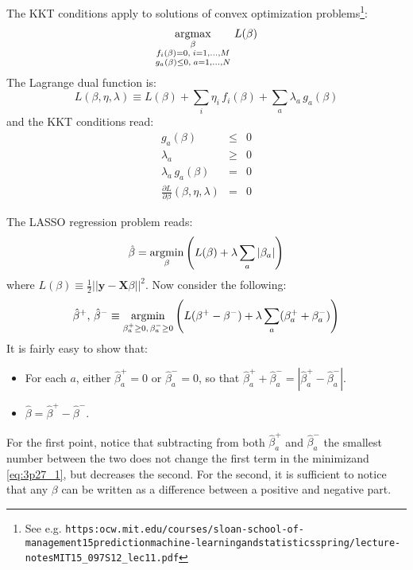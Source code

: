 

The KKT conditions apply to solutions of convex optimization problems\footnote{See e.g.
    \texttt{https:\/\/ocw.mit.edu/courses/sloan-school-of-management\/15\-prediction\-machine-learning\-and\-statistics\-spring/lecture-notes\/MIT15\_097S12\_lec11.pdf}}:
\begin{eqnarray}\label{eq:3p27_0}
    \operatorname*{argmax}_{\substack{\beta\\f_i(\beta) = 0, \; i = 1, \ldots, M \\
    g_a(\beta) \leq 0, \; a = 1, \ldots, N}} \, L(\beta)
\end{eqnarray}
The Lagrange dual function is:
\begin{equation*}
L(\beta, \eta, \lambda) \equiv L(\beta) + \sum_i \eta_i \, f_i(\beta) + 
    \sum_a \lambda_a \, g_a(\beta)
\end{equation*}
and the KKT conditions read:
\begin{eqnarray} \label{eq:3p27_kkt1}
    g_a(\beta) & \leq & 0 \\
    \lambda_a & \geq & 0 \\
    \lambda_a \, g_a(\beta) & = & 0 \\ \label{eq:3p27_kkt4}
    \frac{\partial L}{\partial \beta}(\beta, \eta, \lambda) & = & 0
\end{eqnarray}

The LASSO regression problem reads:
\begin{eqnarray*}
    \hat{\beta} = \operatorname*{argmin}_\beta \left( L(\beta) + \lambda \sum_{a} |\beta_a|\right)
\end{eqnarray*}
where $L(\beta) \equiv \frac{1}{2}||\mathbf{y} - \mathbf{X} \beta||^2$.
Now consider the following:
\begin{equation}\label{eq:3p27_1}
\hat{\beta}^+, \, \hat{\beta}^- \equiv \operatorname*{argmin}_{\beta_a^+ \geq 0, \,\beta_a^- \geq 0} \left( L(\beta^+ - \beta^-) + \lambda \sum_{a} (\beta_a^+ + \beta_a^-)\right)
\end{equation}
It is fairly easy to show that:
\begin{itemize}
    \item For each $a$, either $\hat{\beta}_a^+ = 0$ or $\hat{\beta}_a^- = 0$,
      so that $\hat{\beta}_a^+ + \hat{\beta}_a^- = |\hat{\beta}_a^+ - \hat{\beta}_a^-|$.
    \item $\hat{\beta} = \hat{\beta}^+ - \hat{\beta}^-$.
\end{itemize}
For the first point, notice that subtracting from both $\hat{\beta}_a^+$ and 
$\hat{\beta}_a^-$ the smallest number between the two does not change the first
term in the minimizand \eqref{eq:3p27_1}, but decreases the second. For the second,
it is sufficient to notice that any $\beta$ can be written as a difference
between a positive and negative part.

